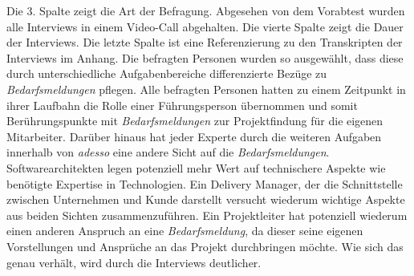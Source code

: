 Die 3. Spalte zeigt die Art der Befragung. Abgesehen von dem Vorabtest wurden alle Interviews in einem Video-Call abgehalten. Die vierte Spalte zeigt die Dauer der Interviews. Die letzte Spalte ist eine Referenzierung zu den Transkripten der Interviews im Anhang. Die befragten Personen wurden so ausgewählt, dass diese durch unterschiedliche Aufgabenbereiche differenzierte Bezüge zu \emph{Bedarfsmeldungen} pflegen. Alle befragten Personen hatten zu einem Zeitpunkt in ihrer Laufbahn die Rolle einer Führungsperson übernommen und somit Berührungspunkte mit \emph{Bedarfsmeldungen} zur Projektfindung für die eigenen Mitarbeiter. Darüber hinaus hat jeder Experte durch die weiteren Aufgaben innerhalb von \emph{adesso} eine andere Sicht auf die \emph{Bedarfsmeldungen}. Softwarearchitekten legen potenziell mehr Wert auf technischere Aspekte wie benötigte Expertise in Technologien. Ein Delivery Manager, der die Schnittstelle zwischen Unternehmen und Kunde darstellt versucht wiederum wichtige Aspekte aus beiden Sichten zusammenzuführen. Ein Projektleiter hat potenziell wiederum einen anderen Anspruch an eine \emph{Bedarfsmeldung}, da dieser seine eigenen Vorstellungen und Ansprüche an das Projekt durchbringen möchte. Wie sich das genau verhält, wird durch die Interviews deutlicher.\\

